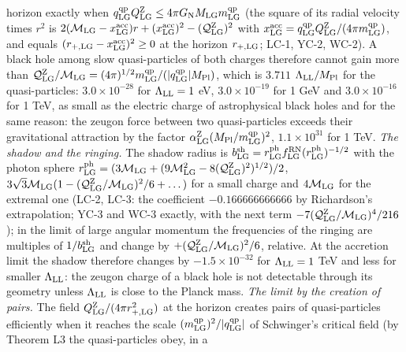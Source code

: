 \documentclass[
  10pt,
]{article}
\begin{document}
\begin{longtable}[]
horizon exactly when
\(q^{\rm qp}_{\rm LG}Q^{\rm Z}_{\rm LG}\le4\pi G_{\rm N}M_{\rm LG}m^{\rm qp}_{\rm LG}\)
(the square of its radial velocity times \(r^2\) is
\(2(\mathcal M_{\rm LG}-x^{\rm acc}_{\rm LG})r+(x^{\rm acc}_{\rm LG})^2-(\mathcal Q^{\rm Z}_{\rm LG})^2\)
with
\(x^{\rm acc}_{\rm LG}=q^{\rm qp}_{\rm LG}Q^{\rm Z}_{\rm LG}/(4\pi m^{\rm qp}_{\rm LG})\),
and equals \((r_{+,\rm LG}-x^{\rm acc}_{\rm LG})^2\ge0\) at the horizon
\(r_{+,\rm LG}\); LC-1, YC-2, WC-2). A black hole among slow
quasi-particles of both charges therefore cannot gain more than
\(\mathcal Q^{\rm Z}_{\rm LG}/\mathcal M_{\rm LG}=(4\pi)^{1/2}m^{\rm qp}_{\rm LG}/(\lvert q^{\rm qp}_{\rm LG}\rvert M_{\rm Pl})\),
which is \(3.711\) \(\Lambda_{\rm LL}/M_{\rm Pl}\) for the
quasi-particles: \(3.0\times10^{-28}\) for \(\Lambda_{\rm LL}=1\) eV,
\(3.0\times10^{-19}\) for 1 GeV and \(3.0\times10^{-16}\) for 1 TeV, as
small as the electric charge of astrophysical black holes and for the
same reason: the zeugon force between two quasi-particles exceeds their
gravitational attraction by the factor
\(\alpha^{\rm Z}_{\rm LG}(M_{\rm Pl}/m^{\rm qp}_{\rm LG})^2\),
\(1.1\times10^{31}\) for 1 TeV. \emph{The shadow and the ringing.} The
shadow radius is
\(b^{\rm sh}_{\rm LG}=r^{\rm ph}_{\rm LG}f^{\rm RN}_{\rm LG}(r^{\rm ph}_{\rm LG})^{-1/2}\)
with the photon sphere
\(r^{\rm ph}_{\rm LG}=(3\mathcal M_{\rm LG}+(9\mathcal M_{\rm LG}^2-8(\mathcal Q^{\rm Z}_{\rm LG})^2)^{1/2})/2\),
\(3\sqrt3\mathcal M_{\rm LG}(1-(\mathcal Q^{\rm Z}_{\rm LG}/\mathcal M_{\rm LG})^2/6+\dots)\)
for a small charge and \(4\mathcal M_{\rm LG}\) for the extremal one
(LC-2, LC-3: the coefficient \(-0.166666666666\) by Richardson's
extrapolation; YC-3 and WC-3 exactly, with the next term
\(-7(\mathcal Q^{\rm Z}_{\rm LG}/\mathcal M_{\rm LG})^4/216\)); in the
limit of large angular momentum the frequencies of the ringing are
multiples of \(1/b^{\rm sh}_{\rm LG}\) and change by
\(+(\mathcal Q^{\rm Z}_{\rm LG}/\mathcal M_{\rm LG})^2/6\), relative. At
the accretion limit the shadow therefore changes by
\(-1.5\times10^{-32}\) for \(\Lambda_{\rm LL}=1\) TeV and less for
smaller \(\Lambda_{\rm LL}\): the zeugon charge of a black hole is not
detectable through its geometry unless \(\Lambda_{\rm LL}\) is close to
the Planck mass. \emph{The limit by the creation of pairs.} The field
\(Q^{\rm Z}_{\rm LG}/(4\pi r_{+,\rm LG}^2)\) at the horizon creates
pairs of quasi-particles efficiently when it reaches the scale
\((m^{\rm qp}_{\rm LG})^2/\lvert q^{\rm qp}_{\rm LG}\rvert\) of
Schwinger's critical field (by Theorem L3 the quasi-particles obey, in a

\end{longtable}
\end{document}
